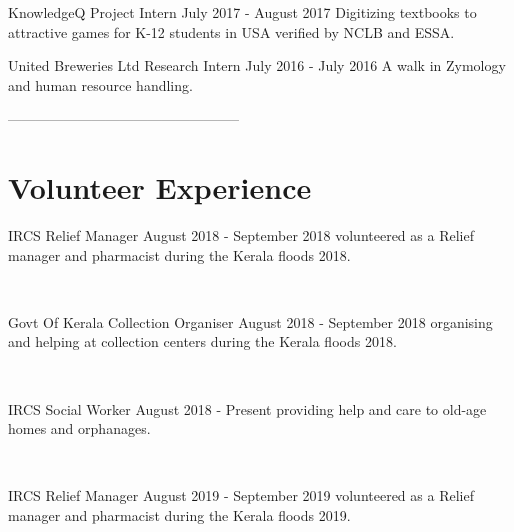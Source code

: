 \documentclass[]{cv-style}          %
\begin{document}
\begin{entrylist}
\entry
{KnowledgeQ}
{Project Intern}
{July 2017 - August 2017}
{Digitizing textbooks to attractive games for K-12 students in USA verified by NCLB and ESSA.}
{\vspace{-0.3cm}}
\end{entrylist}

\begin{entrylist}
\entry
{United Breweries Ltd}
{Research Intern}
{July 2016 - July 2016}
{A walk in Zymology and human resource handling. }
{\vspace{-0.3cm}}
\end{entrylist}


--------------------------------------------------

\section{Volunteer Experience}
  \vspace{-0.3cm}
\begin{entrylist}
\entry
{IRCS}
{Relief Manager}
{August 2018 - September 2018}
{volunteered as a Relief manager and pharmacist  during the Kerala floods 2018.}
\end{entrylist}\
\begin{entrylist}
\entry
{Govt Of Kerala}
{Collection Organiser}
{August 2018 - September 2018}
{organising and helping at collection centers during the Kerala floods 2018.}
\end{entrylist}\
\
\begin{entrylist}
\entry
{IRCS}
{Social Worker}
{August 2018 - Present}
{providing help and care to old-age homes and orphanages.}
\end{entrylist}\

\begin{entrylist}
\entry
{IRCS}
{Relief Manager}
{August 2019 - September 2019}
{volunteered as a Relief manager and pharmacist  during the Kerala floods 2019.}
\end{entrylist}\
\end{document}

